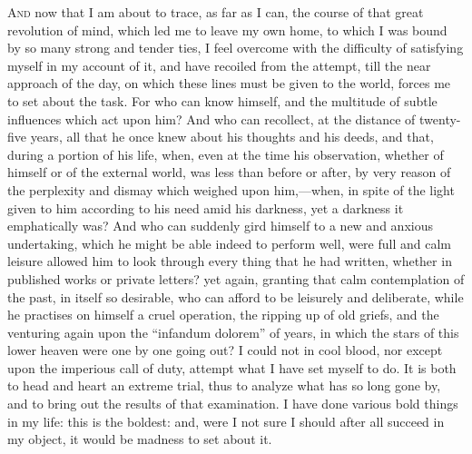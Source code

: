 A\textsc{nd} now that I am about to trace, as far as I can, the
course of that great revolution of mind, which led me to leave my own
home, to which I was bound by so many strong and tender ties, I feel
overcome with the difficulty of satisfying myself in my account of it,
and have recoiled from the attempt, till the near approach of the
day, on which these lines must be given to the world, forces me to set
about the task. For who can know himself, and the multitude of subtle
influences which act upon him? And who can recollect, at the distance of
twenty-five years, all that he once knew about his thoughts and his
deeds, and that, during a portion of his life, when, even at the time his
observation, whether of himself or of the external world, was less than
before or after, by very reason of the perplexity and dismay which
weighed upon him,—when, in spite of the light given to him according
to his need amid his darkness,
yet a darkness it emphatically was? And who can suddenly gird
himself to a new and anxious undertaking, which he might be
able indeed to perform well, were full and calm leisure allowed him to look through every thing that he
had
written, whether in published works or private letters? yet again,
granting that calm contemplation of the past, in itself so
desirable, who can afford to be leisurely and deliberate, while he practises on himself a cruel operation, the ripping up of old griefs,
and the venturing again upon the ``infandum dolorem'' of years,
in which the stars of this lower heaven were one by one going out?
I could not in cool blood, nor except upon the imperious call of duty,
attempt what I have set myself to do. It is both to head and heart an
extreme trial, thus to analyze what has so long gone by, and to bring
out the results of that examination. I have done various bold things in
my life: this is the boldest: and, were I not sure I should after all
succeed in my object, it would be madness to set about it.

